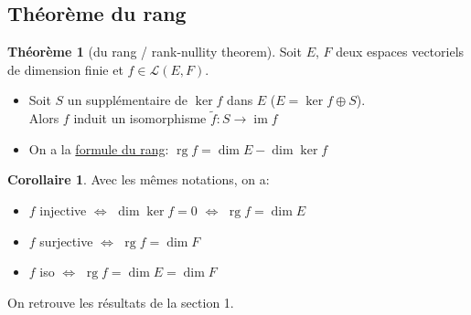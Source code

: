 \documentclass[10pt,a4paper]{article}
\theoremstyle{definition}
\newtheorem{theorem}[proposition]{Théorème}
\newtheorem{corollaire}[proposition]{Corollaire}
\DeclareMathOperator{\rg}{rg}
\DeclareMathOperator{\im}{im}
\begin{document}
\subsection{Théorème du rang}
\begin{theorem}[du rang / rank-nullity theorem]
Soit $E$, $F$ deux espaces vectoriels de dimension finie et $\left. f \in \mathcal{L}(E, F) \right.$.
\begin{itemize}
\item Soit $S$ un supplémentaire de $\ker f$ dans $E$ ($E = \ker f \oplus S$). \\
Alors $f$ induit un isomorphisme $\tilde{f} : S \to \im f$
\item On a la \uline{formule du rang}: $\rg f = \dim E - \dim \ker f$
\end{itemize}
\end{theorem}
\begin{corollaire}
Avec les mêmes notations, on a:
\begin{itemize}
\item $f$ injective $\iff$ $\dim \ker f = 0$ $\iff$ $\rg f = \dim E$
\item $f$ surjective $\iff$ $\rg f = \dim F$
\item $f$ iso $\iff$ $\rg f = \dim E = \dim F$
\end{itemize}
On retrouve les résultats de la section 1.
\end{corollaire}
\end{document}
